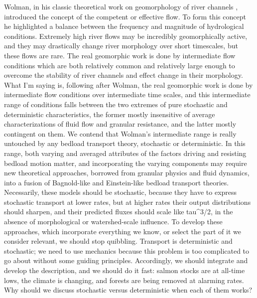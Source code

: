 \documentclass{article}
\begin{document}
{Wolman, in his classic theoretical work on geomorphology of river channels \citep{Wolman1968}, introduced the concept of the competent or effective flow. 
To form this concept he highlighted a balance between the frequency and magnitude of hydrological conditions. 
Extremely high river flows may be incredibly geomorphically active, and they may drastically change river morphology over short timescales, but these flows are rare. 
The real geomorphic work is done by intermediate flow conditions which are both relatively common and relatively large enough to overcome the stability of river channels and effect change in their morphology. 
What I'm saying is, following after Wolman, the real geomorphic work is done by intermediate flow conditions over intermediate time scales, and this intermediate range of conditions falls between the two extremes of pure stochastic and deterministic characteristics, the former mostly insensitive of average characterizations of fluid flow and granular resistance, and the latter mostly contingent on them. 
We contend that Wolman's intermediate range is really untouched by any bedload transport theory, stochastic or deterministic.  
In this range, both varying and averaged attributes of the factors driving and resisting bedload motion matter, and incorporating the varying components may require new theoretical approaches, borrowed from granular physics and fluid dynamics, into a fusion of Bagnold-like and Einstein-like bedload transport theories.
Necessarily, these models should be stochastic, because they have to express stochastic transport at lower rates, but at higher rates their output distributions should sharpen, and their predicted fluxes should scale like tau^3/2, in the absence of morphological or watershed-scale influence. 
To develop these approaches, which incorporate everything we know, or select the part of it we consider relevant, we should stop quibbling. 
Transport is deterministic and stochastic; we need to use mechanics because this problem is too complicated to go about without some guiding principles. 
Accordingly, we should integrate and develop the description, and we should do it fast: salmon stocks are at all-time lows, the climate is changing, and forests are being removed at alarming rates. 
Why should we discuss stochastic versus deterministic when each of them works? 

  


\begin{comment} 


Where is this coupling in Einstein or Bagnold, or under what limits might they retain predictive power? 
More generally, where are the deficiencies in our understanding of bedload transport, and why do our predictions in natural channels fail?


\end{comment}}
\end{document}
